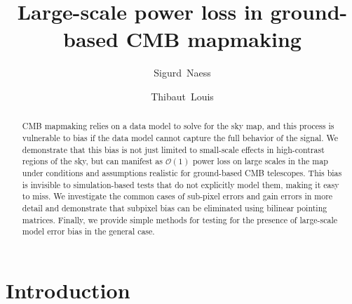 \documentclass[twocolumn,apj]{aastex63}
\begin{document}
\title{Large-scale power loss in ground-based CMB mapmaking}

\author[0000-0002-4478-7111]{Sigurd~Naess}
\author[0000-0002-6849-4217]{Thibaut~Louis}

\keywords{}

\begin{abstract}
CMB mapmaking relies on a data model to solve for the sky map, and this
process is vulnerable to bias if the data model cannot capture the full
behavior of the signal. We demonstrate that this bias is not just limited to
small-scale effects in high-contrast regions of the sky, but can manifest
as $\mathcal{O}(1)$ power loss on large scales in the map under conditions
and assumptions realistic for ground-based CMB telescopes. This bias is
invisible to simulation-based tests that do not explicitly model them,
making it easy to miss. We investigate the common cases of sub-pixel errors
and gain errors in more detail and demonstrate that subpixel bias can
be eliminated using bilinear pointing matrices. Finally, we provide simple
methods for testing for the presence of large-scale model error bias in
the general case.
\vspace*{8mm}
\end{abstract}

\section{Introduction}
\end{document}
